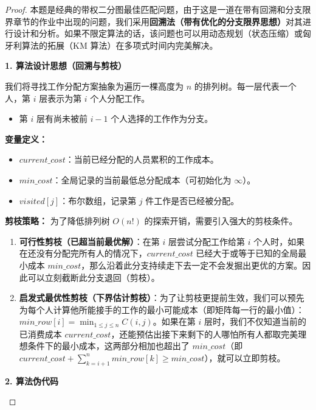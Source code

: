 \documentclass[11pt, a4paper]{article}
\begin{document}
\begin{proof}
    本题是经典的带权二分图最佳匹配问题，由于这是一道在带有回溯和分支限界章节的作业中出现的问题，我们采用\textbf{回溯法（带有优化的分支限界思想）}对其进行设计和分析。如果不限定算法的话，该问题也可以用动态规划（状态压缩）或匈牙利算法的拓展（KM 算法）在多项式时间内完美解决。

    \textbf{1. 算法设计思想（回溯与剪枝）}

    我们将寻找工作分配方案抽象为遍历一棵高度为 $n$ 的排列树。每一层代表一个人，第 $i$ 层表示为第 $i$ 个人分配工作。
    \begin{itemize}
        \item 第 $i$ 层有尚未被前 $i-1$ 个人选择的工作作为分支。
    \end{itemize}

    \textbf{变量定义：}
    \begin{itemize}
        \item $current\_cost$：当前已经分配的人员累积的工作成本。
        \item $min\_cost$：全局记录的当前最低总分配成本（可初始化为 $\infty$）。
        \item $visited[j]$：布尔数组，记录第 $j$ 件工作是否已经被分配。
    \end{itemize}

    \textbf{剪枝策略：}
    为了降低排列树 $O(n!)$ 的探索开销，需要引入强大的剪枝条件。
    \begin{enumerate}
        \item \textbf{可行性剪枝（已超当前最优解）}：在第 $i$ 层尝试分配工作给第 $i$ 个人时，如果在还没有分配完所有人的情况下，$current\_cost$ 已经大于或等于已知的全局最小成本 $min\_cost$，那么沿着此分支持续走下去一定不会发掘出更优的方案。因此可以立刻截断此分支退回（剪枝）。
        \item \textbf{启发式最优性剪枝（下界估计剪枝）}：为了让剪枝更提前生效，我们可以预先为每个人计算他所能接手的工作的最小可能成本（即矩阵每一行的最小值）：$min\_row[i] = \min_{1 \le j \le n} C(i, j)$。如果在第 $i$ 层时，我们不仅知道当前的已消费成本 $current\_cost$，还能预估出接下来剩下的人哪怕所有人都取完美理想条件下的最小成本，这两部分相加也超出了 $min\_cost$（即 $current\_cost + \sum_{k=i+1}^n min\_row[k] \ge min\_cost$），就可以立即剪枝。
    \end{enumerate}

    \textbf{2. 算法伪代码}

    \begin{algorithm}[H]
    \caption{最小成本分派问题的分支限界回溯算法}
    

\end{algorithm}
\end{proof}
\end{document}
